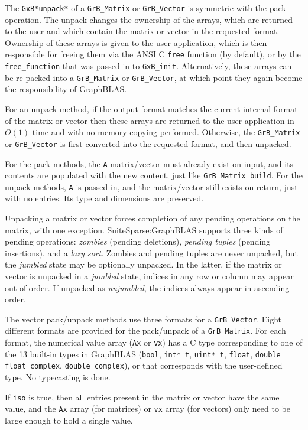 \documentclass[12pt]{article}
\begin{document}
{The \verb'GxB*unpack*' of a \verb'GrB_Matrix' or \verb'GrB_Vector' is symmetric with the
pack operation.  The unpack changes the ownership of the arrays, which are
returned to the user and which contain the
matrix or vector in the requested format.  Ownership of these arrays is given
to the user application, which is then responsible for freeing them via the
ANSI C \verb'free' function (by default), or by the \verb'free_function' that
was passed in to \verb'GxB_init'.  Alternatively, these arrays can be
re-packed into a \verb'GrB_Matrix' or \verb'GrB_Vector', at which point they
again become the responsibility of GraphBLAS.

For an unpack method, if the output format matches the current internal format of the
matrix or vector then these arrays are returned to the user application in
$O(1)$ time and with no memory copying performed.  Otherwise, the
\verb'GrB_Matrix' or \verb'GrB_Vector' is first converted into the requested
format, and then unpacked.

For the pack methods, the \verb'A' matrix/vector must already exist on input, and its contents are
populated with the new content, just like \verb'GrB_Matrix_build'.
For the unpack
methods, \verb'A' is passed in, and the matrix/vector still exists on return,
just with no entries.  Its type and dimensions are preserved.

Unpacking a matrix or vector forces completion of any pending
operations on the matrix, with one exception.  SuiteSparse:GraphBLAS supports
three kinds of pending operations: {\em zombies} (pending deletions), {\em
pending tuples} (pending insertions), and a {\em lazy sort}.  Zombies and
pending tuples are never unpacked, but the {\em jumbled} state may be
optionally unpacked.  In the latter, if the matrix or vector is unpacked in a
{\em jumbled} state, indices in any row or column may appear out of order.  If
unpacked as {\em unjumbled}, the indices always appear in ascending order.

The vector pack/unpack methods use three formats for a
\verb'GrB_Vector'.  Eight different formats are provided for the
pack/unpack of a \verb'GrB_Matrix'.  For each format, the
numerical value array (\verb'Ax' or \verb'vx') has a C type corresponding to
one of the 13 built-in types in GraphBLAS (\verb'bool', \verb'int*_t',
\verb'uint*_t', \verb'float', \verb'double' \verb'float complex', \verb'double complex'),
or that corresponds with the user-defined type.  No typecasting is
done.

If \verb'iso' is true, then all entries present in the matrix or vector
have the same value, and the \verb'Ax' array (for matrices) or \verb'vx' array
(for vectors) only need to be large enough to hold a single value.

}
\end{document}
